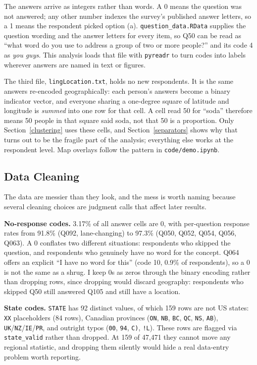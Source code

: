 \documentclass[10pt,letterpaper]{article}
\begin{document}
The answers arrive as integers rather than words. A 0 means the question was
not answered; any other number indexes the survey's published answer letters,
so a 1 means the respondent picked option (a). \texttt{question\_data.RData}
supplies the question wording and the answer letters for every item, so Q50 can
be read as ``what word do you use to address a group of two or more people?''
and its code 4 as \emph{you guys}. This analysis loads that file with
\texttt{pyreadr} to turn codes into labels wherever answers are named in text
or figures.

The third file, \texttt{lingLocation.txt}, holds no new respondents. It is the
same answers re-encoded geographically: each person's answers become a binary
indicator vector, and everyone sharing a one-degree square of latitude and
longitude is \emph{summed} into one row for that cell. A cell read 50 for
``soda'' therefore means 50 people in that square said soda, not that 50 is a
proportion. Only Section~\ref{clustering} uses these cells, and
Section~\ref{separators} shows why that turns out to be the fragile part of
the analysis; everything else works at the respondent level. Map overlays
follow the pattern in \texttt{code/demo.ipynb}.

\subsection{Data Cleaning}\label{data-cleaning}

The data are messier than they look, and the mess is worth naming because
several cleaning choices are judgment calls that affect later results.

\textbf{No-response codes.} 3.17\% of all answer cells are 0, with per-question
response rates from 91.8\% (Q092, lane-changing) to 97.3\% (Q050, Q052, Q054,
Q056, Q063). A 0 conflates two different situations: respondents who skipped
the question, and respondents who genuinely have no word for the concept.
Q064 offers an explicit ``I have no word for this'' (code 10, 0.9\% of
respondents), so a 0 is not the same as a shrug. I keep 0s as zeros through the
binary encoding rather than dropping rows, since dropping would discard
geography: respondents who skipped Q50 still answered Q105 and still have a
location.

\textbf{State codes.} \texttt{STATE} has 92 distinct values, of which 159 rows
are not US states: \texttt{XX} placeholders (84 rows), Canadian provinces
(\texttt{ON}, \texttt{NB}, \texttt{BC}, \texttt{QC}, \texttt{NS}, \texttt{AB}),
\texttt{UK}/\texttt{NZ}/\texttt{IE}/\texttt{PR}, and outright typos
(\texttt{00}, \texttt{94}, \texttt{C)}, \texttt{!L}). These rows are flagged
via \texttt{state\_valid} rather than dropped. At 159 of 47,471 they cannot
move any regional statistic, and dropping them silently would hide a real
data-entry problem worth reporting.
\end{document}
